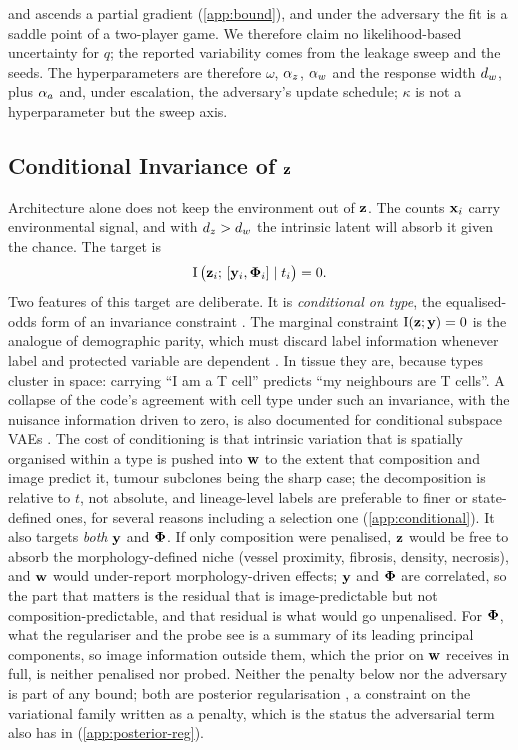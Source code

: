 and ascends a partial gradient (\cref{app:bound}), and under the adversary the fit is a saddle point of a two-player game. We therefore claim no likelihood-based uncertainty for $q$; the reported variability comes from the leakage sweep and the seeds. The hyperparameters are therefore $\omega$, $\alpha_z$, $\alpha_w$ and the response width $d_w$, plus $\alpha_a$ and, under escalation, the adversary's update schedule; $\kappa$ is not a hyperparameter but the sweep axis.

\subsection{Conditional Invariance of \texorpdfstring{$\mathbf{z}$}{z}}
\label{sec:invariance}

 Architecture alone does not keep the environment out of $\mathbf{z}$. The counts $\mathbf{x}_i$ carry environmental signal, and with $d_z > d_w$ the intrinsic latent will absorb it given the chance. The target is
\begin{equation}
  \operatorname{I}\big(\mathbf{z}_i;\, [\mathbf{y}_i, \boldsymbol{\Phi}_i] \mid t_i\big) = 0.
  \label{eq:invariance-target}
\end{equation}
Two features of this target are deliberate. It is \emph{conditional on type}, the equalised-odds form of an invariance constraint \citep{hardt2016,zhang2018mitigating}. The marginal constraint $\operatorname{I}(\mathbf{z}; \mathbf{y}) = 0$ is the analogue of demographic parity, which must discard label information whenever label and protected variable are dependent \citep{zhao2019inherent}. In tissue they are, because types cluster in space: carrying ``I am a T cell'' predicts ``my neighbours are T cells''. A collapse of the code's agreement with cell type under such an invariance, with the nuisance information driven to zero, is also documented for conditional subspace VAEs \citep{klys2018,slavutsky2025}. The cost of conditioning is that intrinsic variation that is spatially organised within a type is pushed into $\mathbf{w}$ to the extent that composition and image predict it, tumour subclones being the sharp case; the decomposition is relative to $t$, not absolute, and lineage-level labels are preferable to finer or state-defined ones, for several reasons including a selection one (\cref{app:conditional}). It also targets \emph{both} $\mathbf{y}$ and $\boldsymbol{\Phi}$. If only composition were penalised, $\mathbf{z}$ would be free to absorb the morphology-defined niche (vessel proximity, fibrosis, density, necrosis), and $\mathbf{w}$ would under-report morphology-driven effects; $\mathbf{y}$ and $\boldsymbol{\Phi}$ are correlated, so the part that matters is the residual that is image-predictable but not composition-predictable, and that residual is what would go unpenalised. For $\boldsymbol{\Phi}$, what the regulariser and the probe see is a summary of its leading principal components, so image information outside them, which the prior on $\mathbf{w}$ receives in full, is neither penalised nor probed. Neither the penalty below nor the adversary is part of any bound; both are posterior regularisation \citep{ganchev2010}, a constraint on the variational family written as a penalty, which is the status the adversarial term also has in \citet{slavutsky2025} (\cref{app:posterior-reg}).


